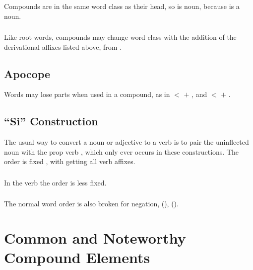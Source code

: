 \subsubsection{} Compounds are in the same word class as their head,
so   is noun, because   is a
noun.

\subsubsection{} Like root words, compounds may change word class with
the addition of the derivational affixes listed above,
  from  .


\subsection{Apocope} Words may lose parts when used in a compound, as
in   $<$   $+$
 , and   $<$
  $+$  .


\subsection{``Si'' Construction} The usual way to convert a noun or
adjective to a verb is to pair the uninflected noun with the prop verb
, which only ever occurs in these constructions.  The order is
fixed , with  getting all verb affixes.\label{lingop:si-const}

\subsubsection{} In the verb   the order is
less fixed.

\subsubsection{} The normal  word order is also broken for
negation,   (),
  ().


\section{Common and Noteworthy Compound Elements}

